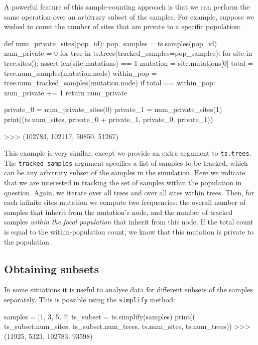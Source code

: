 \documentclass[graybox]{svmult}
\begin{document}
A powerful feature of this sample-counting approach is that we can
perform the same operation over an arbitrary subset of the samples. For
example, suppose we wished to count the number of sites that are private
to a specific population:

\begin{pythoncode}
def num_private_sites(pop_id):
    pop_samples = ts.samples(pop_id)
    num_private = 0
    for tree in ts.trees(tracked_samples=pop_samples):
        for site in tree.sites():
            assert len(site.mutations) == 1
            mutation = site.mutations[0]
            total = tree.num_samples(mutation.node)
            within_pop = tree.num_tracked_samples(mutation.node)
            if total == within_pop:
                num_private += 1
    return num_private

private_0 = num_private_sites(0)
private_1 = num_private_sites(1)
print((ts.num_sites, private_0 + private_1, private_0, private_1))

>>> (102783, 102117, 50850, 51267)
\end{pythoncode}

    This example is very similar, except we provide an extra argument to
\texttt{ts.trees}. The \texttt{tracked\_samples} argument specifies a list of samples to be tracked, which can be
any arbitrary subset of the samples in the simulation. Here we indicate
that we are interested in tracking the set of samples within the
population in question. Again, we iterate over all trees and over all
sites within trees. Then, for each infinite sites mutation we
compute two frequencies: the overall number of samples that inherit from
the mutation's node, and the number of tracked samples \emph{within the focal
population} that inherit from this node. If the total count is
equal to the within-population count, we know that this mutation is private to the population.

\subsection{Obtaining subsets}\label{obtaining-subsets}

In some situations it is useful to analyse data for different subsets of
the samples separately. This is possible using the \texttt{simplify}
method:

\begin{pythoncode}
samples = [1, 3, 5, 7]
ts_subset = ts.simplify(samples)
print((
    ts_subset.num_sites, ts_subset.num_trees,
    ts.num_sites, ts.num_trees))
>>> (11925, 5323, 102783, 93598)
\end{pythoncode}
\end{document}
